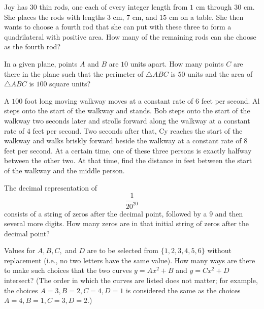 \documentclass{article}
\begin{document}
\begin{prob}[AMC 10A 2017/10]{2}
Joy has $30$ thin rods, one each of every integer length from $1$ cm through $30$ cm. She places the rods with lengths $3$ cm, $7$ cm, and $15$ cm on a table. She then wants to choose a fourth rod that she can put with these three to form a quadrilateral with positive area. How many of the remaining rods can she choose as the fourth rod?
\end{prob}

\begin{prob}[AMC 10B 2019/10]{3}
In a given plane, points $A$ and $B$ are $10$ units apart. How many points $C$ are there in the plane such that the perimeter of $\triangle ABC$ is $50$ units and the area of $\triangle ABC$ is $100$ square units?
\end{prob}

\begin{prob}[AIME I 2007/2]{3}
A $100$ foot long moving walkway moves at a constant rate of $6$ feet per second. Al steps onto the start of the walkway and stands. Bob steps onto the start of the walkway two seconds later and strolls forward along the walkway at a constant rate of $4$ feet per second. Two seconds after that, Cy reaches the start of the walkway and walks briskly forward beside the walkway at a constant rate of $8$ feet per second. At a certain time, one of these three persons is exactly halfway between the other two. At that time, find the distance in feet between the start of the walkway and the middle person.
\end{prob}

\begin{prob}[AMC 10B 2020/12]{3}
The decimal representation of\[\dfrac{1}{20^{20}}\]consists of a string of zeros after the decimal point, followed by a $9$ and then several more digits. How many zeros are in that initial string of zeros after the decimal point?
\end{prob}

\begin{prob}[AMC 10A 2021/15]{3}
Values for $A, B, C,$ and $D$ are to be selected from $\{1, 2, 3, 4, 5, 6 \}$ without replacement (i.e., no two letters have the same value). How many ways are there to make such choices that the two curves $y=Ax^2+B$ and $y=Cx^2+D$ intersect? (The order in which the curves are listed does not matter; for example, the choices $A=3, B=2, C=4, D=1$ is considered the same as the choices $A=4, B=1, C=3, D=2.$)
\end{prob}
\end{document}
